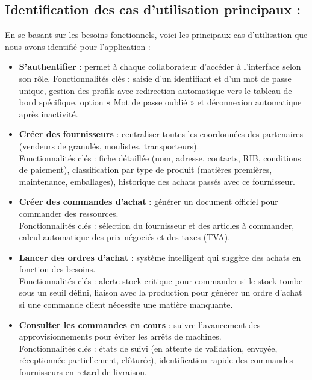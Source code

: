 \subsection{Identification des cas d'utilisation principaux :}
En se basant sur les besoins fonctionnels, voici les principaux cas d'utilisation que nous avons identifié pour l'application \reportAppName{} :
\begin{itemize}
    \item \textbf{S'authentifier} : permet à chaque collaborateur d'accéder à l'interface selon son rôle. Fonctionnalités clés : saisie d'un identifiant et d'un mot de passe unique, gestion des profils avec redirection automatique vers le tableau de bord spécifique, option « Mot de passe oublié » et déconnexion automatique après inactivité.

    \item \textbf{Créer des fournisseurs} : centraliser toutes les coordonnées des partenaires (vendeurs de granulés, moulistes, transporteurs).\\ Fonctionnalités clés : fiche détaillée (nom, adresse, contacts, RIB, conditions de paiement), classification par type de produit (matières premières, maintenance, emballages), historique des achats passés avec ce fournisseur.

    \item \textbf{Créer des commandes d'achat} : générer un document officiel pour commander des ressources.\\ Fonctionnalités clés : sélection du fournisseur et des articles à commander, calcul automatique des prix négociés et des taxes (TVA).

    \item \textbf{Lancer des ordres d'achat} : système intelligent qui suggère des achats en fonction des besoins.\\ Fonctionnalités clés : alerte stock critique pour commander si le stock tombe sous un seuil défini, liaison avec la production pour générer un ordre d'achat si une commande client nécessite une matière manquante.

    \item \textbf{Consulter les commandes en cours } : suivre l'avancement des approvisionnements pour éviter les arrêts de machines.\\ Fonctionnalités clés : états de suivi (en attente de validation, envoyée, réceptionnée partiellement, clôturée), identification rapide des commandes fournisseurs en retard de livraison.


\end{itemize}
